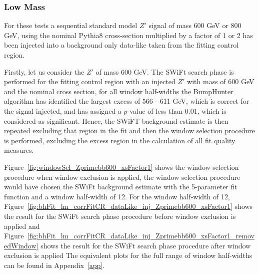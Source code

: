 \subsubsection{Low Mass}
\label{sec:lowmass_signalInj}

For these tests a sequential standard model $Z'$ signal of mass 600 GeV or 800 GeV,
using the nominal Pythia8 cross-section multiplied by a factor of 1 or 2 has been injected into a background only data-like taken from the fitting control region.

Firstly, let us consider the $Z'$ of mass 600 GeV.
The SWiFt search phase is performed for the fitting control region with an injected $Z'$ with mass of 600 GeV and the nominal cross section,
for all window half-widths the {\sc BumpHunter} algorithm has identified the largest excess of 566 - 611 GeV, which is correct for the signal injected,
and has assigned a $p$-value of less than 0.01, which is considered as significant.
Hence, the SWiFT background estimate is then repeated excluding that region in the fit and then the window selection procedure is performed,
excluding the excess region in the calculation of all fit quality measures.

Figure~\ref{fig:windowSel_Zprimebb600_xsFactor1} shows the window selection procedure when window exclusion is applied,
the window selection procedure would have chosen the SWiFt background estimate with the 5-parameter fit function and a window half-width of 12.
For the window half-width of 12, Figure~\ref{fig:bhFit_lm_corrFitCR_dataLike_inj_Zprimebb600_xsFactor1} shows the result for the SWiFt search phase procedure before window exclusion is applied 
and Figure~\ref{fig:bhFit_lm_corrFitCR_dataLike_inj_Zprimebb600_xsFactor1_removedWindow} shows the result for the SWiFt search phase procedure after window exclusion is applied
The equivalent plots for the full range of window half-widths can be found in Appendix~\ref{app}.


